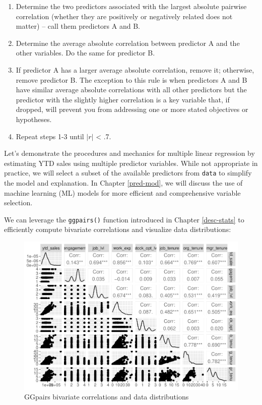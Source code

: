 \documentclass[
]{book}
\providecommand{\tightlist}{%
  \setlength{\itemsep}{0pt}\setlength{\parskip}{0pt}}
\begin{document}
\begin{enumerate}
\def\labelenumi{\arabic{enumi}.}
\tightlist
\item
  Determine the two predictors associated with the largest absolute pairwise correlation (whether they are positively or negatively related does not matter) -- call them predictors A and B.
\item
  Determine the average absolute correlation between predictor A and the other variables. Do the same for predictor B.
\item
  If predictor A has a larger average absolute correlation, remove it; otherwise, remove predictor B. The exception to this rule is when predictors A and B have similar average absolute correlations with all other predictors but the predictor with the slightly higher correlation is a key variable that, if dropped, will prevent you from addressing one or more stated objectives or hypotheses.
\item
  Repeat steps 1-3 until \(|r|\) \textless{} .7.
\end{enumerate}

Let's demonstrate the procedures and mechanics for multiple linear regression by estimating YTD sales using multiple predictor variables. While not appropriate in practice, we will select a subset of the available predictors from \texttt{data} to simplify the model and explanation. In Chapter \ref{pred-mod}, we will discuss the use of machine learning (ML) models for more efficient and comprehensive variable selection.

We can leverage the \texttt{ggpairs()} function introduced in Chapter \ref{desc-stats} to efficiently compute bivariate correlations and visualize data distributions:

\begin{figure}

{\centering \includegraphics[width=1\linewidth]{The_Fundamentals_of_People_Analytics_files/figure-latex/ggpairs-ytd-sales-1} 

}

\caption{GGpairs bivariate correlations and data distributions}\label{fig:ggpairs-ytd-sales}
\end{figure}
\end{document}
